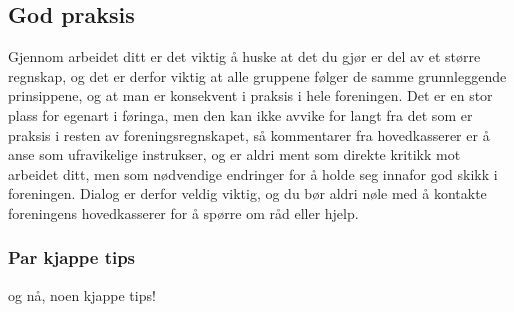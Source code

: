 \subsection{God praksis}
Gjennom arbeidet ditt er det viktig å huske at det du gjør er del av et større regnskap, og det er derfor viktig at alle gruppene følger de samme grunnleggende prinsippene, og at man er konsekvent i praksis i hele foreningen.
Det er en stor plass for egenart i føringa, men den kan ikke avvike for langt fra det som er praksis i resten av foreningsregnskapet, så kommentarer fra hovedkasserer er å anse som ufravikelige instrukser, og er aldri ment som direkte kritikk mot arbeidet ditt, men som nødvendige endringer for å holde seg innafor god skikk i foreningen.
Dialog er derfor veldig viktig, og du bør aldri nøle med å kontakte foreningens hovedkasserer for å spørre om råd eller hjelp.

\subsubsection*{Par kjappe tips}
og nå, noen kjappe tips!

